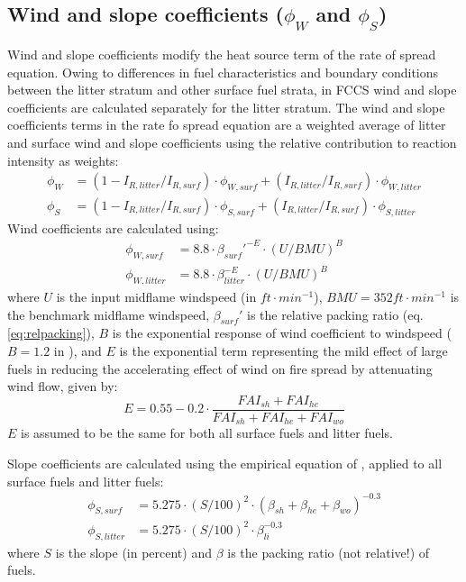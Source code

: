 \documentclass[]{book}
\begin{document}
\subsection{Wind and slope coefficients ($\phi_W$ and $\phi_S$)}

Wind and slope coefficients modify the heat source term of the rate of spread equation. Owing to differences in fuel characteristics and boundary conditions between the litter stratum and other surface fuel strata, in FCCS wind and slope coefficients are calculated separately for the litter stratum. The wind and slope coefficients terms in the rate fo spread equation are a weighted average of litter and surface wind and slope coefficients using the relative contribution to reaction intensity as weights:
\begin{eqnarray}
\phi_W &= (1 - I_{R, litter}/I_{R, surf})\cdot \phi_{W, surf} + (I_{R, litter}/I_{R, surf})\cdot \phi_{W, litter}\\
\phi_S &= (1 - I_{R, litter}/I_{R, surf})\cdot \phi_{S, surf} + (I_{R, litter}/I_{R, surf})\cdot \phi_{S, litter}
\end{eqnarray}
Wind coefficients are calculated using:
\begin{eqnarray}
\phi_{W, surf} &= 8.8 \cdot \beta_{surf}'^{-E}\cdot (U/BMU)^B\\
\phi_{W, litter} &= 8.8 \cdot \beta_{litter}^{-E}\cdot (U/BMU)^B
\end{eqnarray}
where \(U\) is the input midflame windspeed (in \(ft\cdot min^{-1}\)), \(BMU=352 ft\cdot min^{-1}\) is the benchmark midflame windspeed, \(\beta_{surf}'\) is the relative packing ratio (eq. \ref{eq:relpacking}), \(B\) is the exponential response of wind coefficient to windspeed (\(B=1.2\) in \citet{Sandberg2007}), and \(E\) is the exponential term representing the mild effect of large fuels in reducing the accelerating effect of wind on fire spread by attenuating wind flow, given by:
\begin{equation}
E = 0.55 - 0.2 \cdot \frac{FAI_{sh}+FAI_{he}}{FAI_{sh}+FAI_{he}+FAI_{wo}}
\end{equation}
\(E\) is assumed to be the same for both all surface fuels and litter fuels.

Slope coefficients are calculated using the empirical equation of \citet{Rothermel1972}, applied to all surface fuels and litter fuels:
\begin{eqnarray}
\phi_{S, surf} &= 5.275 \cdot (S/100)^{2}\cdot (\beta_{sh}+\beta_{he}+\beta_{wo})^{-0.3}\\
\phi_{S, litter} &= 5.275 \cdot (S/100)^{2}\cdot \beta_{li}^{-0.3}
\end{eqnarray}
where \(S\) is the slope (in percent) and \(\beta\) is the packing ratio (not relative!) of fuels.
\end{document}

